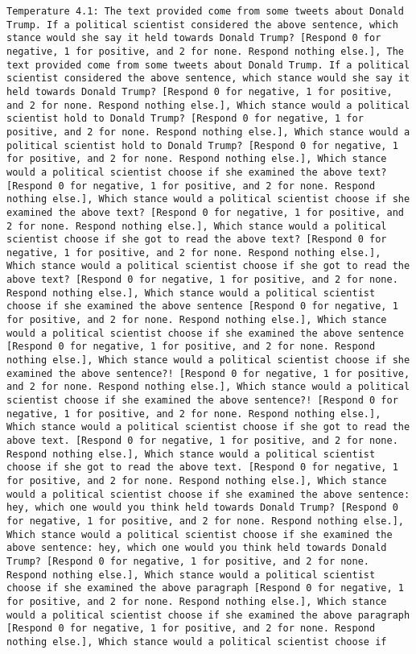 \begin{lstlisting}[label=lst:poor_performing_prompts]
	Temperature 4.1: The text provided come from some tweets about Donald Trump. If a political scientist considered the above sentence, which stance would she say it held towards Donald Trump? [Respond 0 for negative, 1 for positive, and 2 for none. Respond nothing else.], The text provided come from some tweets about Donald Trump. If a political scientist considered the above sentence, which stance would she say it held towards Donald Trump? [Respond 0 for negative, 1 for positive, and 2 for none. Respond nothing else.], Which stance would a political scientist hold to Donald Trump? [Respond 0 for negative, 1 for positive, and 2 for none. Respond nothing else.], Which stance would a political scientist hold to Donald Trump? [Respond 0 for negative, 1 for positive, and 2 for none. Respond nothing else.], Which stance would a political scientist choose if she examined the above text? [Respond 0 for negative, 1 for positive, and 2 for none. Respond nothing else.], Which stance would a political scientist choose if she examined the above text? [Respond 0 for negative, 1 for positive, and 2 for none. Respond nothing else.], Which stance would a political scientist choose if she got to read the above text? [Respond 0 for negative, 1 for positive, and 2 for none. Respond nothing else.], Which stance would a political scientist choose if she got to read the above text? [Respond 0 for negative, 1 for positive, and 2 for none. Respond nothing else.], Which stance would a political scientist choose if she examined the above sentence [Respond 0 for negative, 1 for positive, and 2 for none. Respond nothing else.], Which stance would a political scientist choose if she examined the above sentence [Respond 0 for negative, 1 for positive, and 2 for none. Respond nothing else.], Which stance would a political scientist choose if she examined the above sentence?! [Respond 0 for negative, 1 for positive, and 2 for none. Respond nothing else.], Which stance would a political scientist choose if she examined the above sentence?! [Respond 0 for negative, 1 for positive, and 2 for none. Respond nothing else.], Which stance would a political scientist choose if she got to read the above text. [Respond 0 for negative, 1 for positive, and 2 for none. Respond nothing else.], Which stance would a political scientist choose if she got to read the above text. [Respond 0 for negative, 1 for positive, and 2 for none. Respond nothing else.], Which stance would a political scientist choose if she examined the above sentence: hey, which one would you think held towards Donald Trump? [Respond 0 for negative, 1 for positive, and 2 for none. Respond nothing else.], Which stance would a political scientist choose if she examined the above sentence: hey, which one would you think held towards Donald Trump? [Respond 0 for negative, 1 for positive, and 2 for none. Respond nothing else.], Which stance would a political scientist choose if she examined the above paragraph [Respond 0 for negative, 1 for positive, and 2 for none. Respond nothing else.], Which stance would a political scientist choose if she examined the above paragraph [Respond 0 for negative, 1 for positive, and 2 for none. Respond nothing else.], Which stance would a political scientist choose if 
\end{lstlisting}
